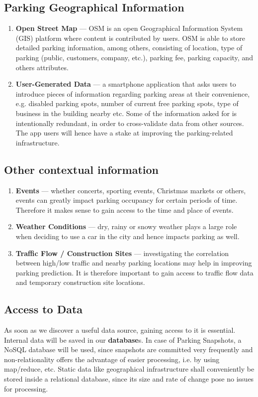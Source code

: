 \documentclass{article}
\begin{document}
\subsection{Parking Geographical Information}
\label{parking-geo-info}
\begin{enumerate}
\item \textbf{Open Street Map} --- OSM is an open Geographical Information System (GIS) platform where content is contributed by users. OSM is able to store detailed parking information, among others, consisting of location, type of parking (public, customers, company, etc.), parking fee, parking capacity, and others attributes.
\item \textbf{User-Generated Data} --- a smartphone application that asks users to introduce pieces of information regarding parking areas at their convenience, e.g. disabled parking spots, number of current free parking spots, type of business in the building nearby etc. Some of the information asked for is intentionally redundant, in order to cross-validate data from other sources. The app users will hence have a stake at improving the parking-related infrastructure. 
\end{enumerate}

\subsection{Other contextual information}
\label{other-context-info}
\begin{enumerate}
\item \textbf{Events} --- whether concerts, sporting events, Christmas markets or others, events can greatly impact parking occupancy for certain periods of time. Therefore it makes sense to gain access to the time and place of events.
\item \textbf{Weather Conditions} --- dry, rainy or snowy weather plays a large role when deciding to use a car in the city and hence impacts parking as well.
\item \textbf{Traffic Flow / Construction Sites} --- investigating the correlation between high/low traffic and nearby parking locations may help in improving parking prediction. It is therefore important to gain access to traffic flow data and temporary construction site locations.
\end{enumerate}

\subsection{Access to Data}
\label{sec:access-to-data}
As soon as we discover a useful data source, gaining access to it is essential. Internal data will be saved in our \textbf{database}s. In case of Parking Snapshots, a NoSQL database will be used, since snapshots are committed very frequently and non-relationality offers the advantage of easier processing, i.e. by using map/reduce, etc. Static data like geographical infrastructure shall conveniently be stored inside a relational database, since its size and rate of change pose no issues for processing.
\end{document}
